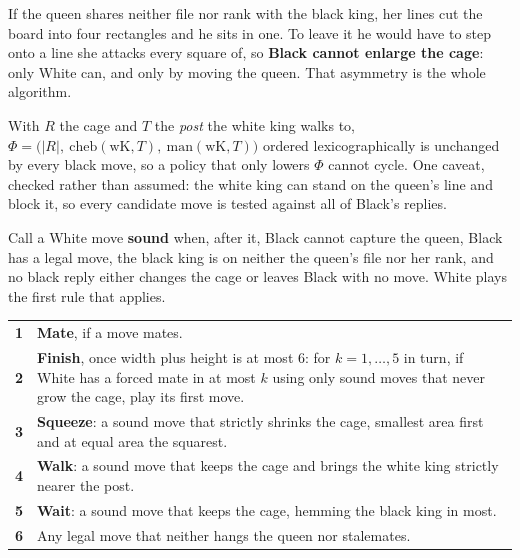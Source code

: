 \documentclass[10pt]{article}
\begin{document}
\medskip
\noindent
\begin{minipage}[t]{0.34\textwidth}
\end{minipage}\hfill
\begin{minipage}[t]{0.62\textwidth}\vspace{0pt}\small
If the queen shares neither file nor rank with the black king, her lines cut
the board into four rectangles and he sits in one. To leave it he would have to
step onto a line she attacks every square of, so \textbf{Black cannot enlarge
the cage}: only White can, and only by moving the queen. That asymmetry is the
whole algorithm.

\smallskip
With $R$ the cage and $T$ the \emph{post} the white king walks to,
$\Phi = \bigl(|R|,\ \mathrm{cheb}(\text{wK},T),\ \mathrm{man}(\text{wK},T)\bigr)$
ordered lexicographically is unchanged by every black move, so a policy that
only lowers $\Phi$ cannot cycle. One caveat, checked rather than assumed: the
white king can stand on the queen's line and block it, so every candidate move
is tested against all of Black's replies.
\end{minipage}

\medskip
\noindent
Call a White move \textbf{sound} when, after it, Black cannot capture the
queen, Black has a legal move, the black king is on neither the queen's file
nor her rank, and no black reply either changes the cage or leaves Black with
no move. White plays the first rule that applies.

\begin{center}\small
\begin{tabular}{@{}rp{}@{}}
\toprule
\textbf{1} & \textbf{Mate}, if a move mates. \\
\textbf{2} & \textbf{Finish}, once width plus height is at most 6: for
$k=1,\dots,5$ in turn, if White has a forced mate in at most $k$ using only
sound moves that never grow the cage, play its first move. \\
\textbf{3} & \textbf{Squeeze}: a sound move that strictly shrinks the cage,
smallest area first and at equal area the squarest. \\
\textbf{4} & \textbf{Walk}: a sound move that keeps the cage and brings the
white king strictly nearer the post. \\
\textbf{5} & \textbf{Wait}: a sound move that keeps the cage, hemming the black
king in most. \\
\textbf{6} & Any legal move that neither hangs the queen nor stalemates. \\
\bottomrule
\end{tabular}
\end{center}
\end{document}
